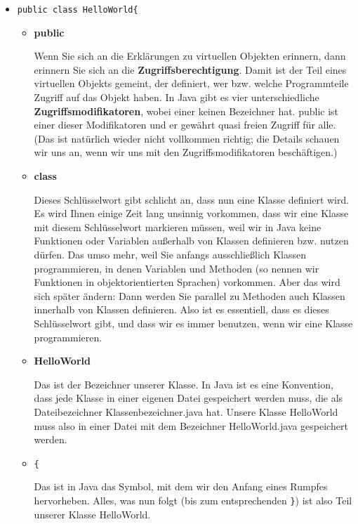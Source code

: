 \begin{itemize}
	\item \verb|public class HelloWorld{|
	
	
	\begin{itemize}
		\item \textbf{public}
		
		Wenn Sie sich an die Erklärungen zu virtuellen Objekten erinnern, dann erinnern Sie sich an die \textbf{Zugriffsberechtigung}. Damit ist der Teil eines virtuellen Objekts gemeint, der definiert, wer bzw. welche Programmteile Zugriff auf das Objekt haben. In Java gibt es vier unterschiedliche \textbf{Zugriffsmodifikatoren}, wobei einer keinen Bezeichner hat. public ist einer dieser Modifikatoren und er gewährt quasi freien Zugriff für alle. (Das ist natürlich wieder nicht vollkommen richtig; die Details schauen wir uns an, wenn wir uns mit den Zugriffsmodifikatoren beschäftigen.)
		
		\item \textbf{class}
		
		Dieses Schlüsselwort gibt schlicht an, dass nun eine Klasse definiert wird. Es wird Ihnen einige Zeit lang unsinnig vorkommen, dass wir eine Klasse mit diesem Schlüsselwort markieren müssen, weil wir in Java keine Funktionen oder Variablen außerhalb von Klassen definieren bzw. nutzen dürfen. Das umso mehr, weil Sie anfangs ausschließlich Klassen programmieren, in denen Variablen und Methoden (so nennen wir Funktionen in objektorientierten Sprachen) vorkommen. Aber das wird sich später ändern: Dann werden Sie parallel zu Methoden auch Klassen innerhalb von Klassen definieren. Also ist es essentiell, dass es dieses Schlüsselwort gibt, und dass wir es immer benutzen, wenn wir eine Klasse programmieren.
		
		\item \textbf{HelloWorld}
		
		Das ist der Bezeichner unserer Klasse. In Java ist es eine Konvention, dass jede Klasse in einer eigenen Datei gespeichert werden muss, die als Dateibezeichner Klassenbezeichner.java hat. Unsere Klasse HelloWorld muss also in einer Datei mit dem Bezeichner HelloWorld.java gespeichert werden.
		
		\item \verb|{|
		
		Das ist in Java das Symbol, mit dem wir den Anfang eines Rumpfes hervorheben. Alles, was nun folgt (bis zum entsprechenden \verb|}|) ist also Teil unserer Klasse HelloWorld.
	\end{itemize}
	

\end{itemize}
